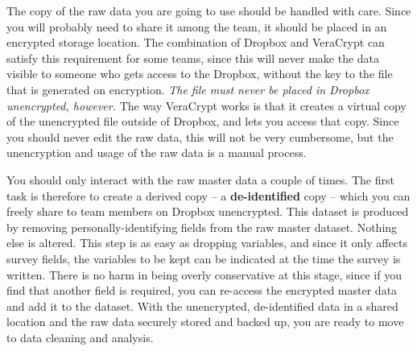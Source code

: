 The copy of the raw data you are going to use
should be handled with care.
Since you will probably need to share it among the team,
it should be placed in an encrypted storage location.
The combination of Dropbox and VeraCrypt
can satisfy this requirement for some teams,
since this will never make the data visible to someone
who gets access to the Dropbox,
without the key to the file that is generated on encryption.
\textit{The file must never be placed in Dropbox unencrypted, however.}
The way VeraCrypt works is that it creates a virtual copy
of the unencrypted file outside of Dropbox, and lets you access that copy.
Since you should never edit the raw data, this will not be very cumbersome,
but the unencryption and usage of the raw data is a manual process.

You should only interact with the raw master data a couple of times.
The first task is therefore to create a derived copy --
a \textbf{de-identified} copy --
which you can freely share to team members on Dropbox unencrypted.
This dataset is produced by removing personally-identifying fields
from the raw master dataset. Nothing else is altered.
This step is as easy as dropping variables,
and since it only affects survey fields,
the variables to be kept can be indicated at the time the survey is written.
There is no harm in being overly conservative at this stage,
since if you find that another field is required,
you can re-access the encrypted master data and add it to the dataset.
With the unencrypted, de-identified data in a shared location
and the raw data securely stored and backed up,
you are ready to move to data cleaning and analysis.
